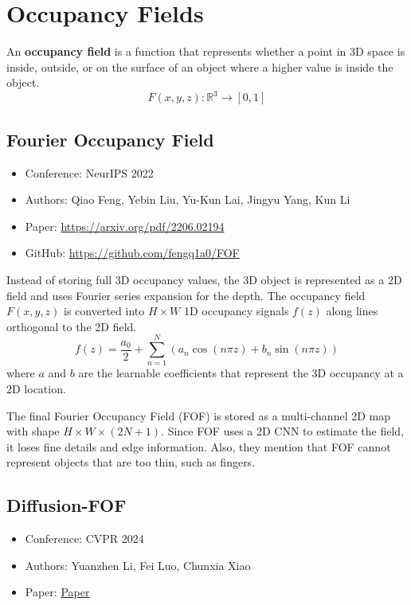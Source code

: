 \documentclass{article}
\begin{document}
\section*{Occupancy Fields}
An \textbf{occupancy field} is a function that represents whether a point in 3D space is inside, outside, or on the surface of an object where a higher value is inside the object.
\[F(x,y,z):\mathbb{R}^3\rightarrow[0,1]\]

\subsection*{Fourier Occupancy Field}

\begin{itemize}
    \item Conference: NeurIPS 2022
    \item Authors: Qiao Feng, Yebin Liu, Yu-Kun Lai, Jingyu Yang, Kun Li
    \item Paper: \url{https://arxiv.org/pdf/2206.02194}
    \item GitHub: \url{https://github.com/fengq1a0/FOF}
\end{itemize}

Instead of storing full 3D occupancy values, the 3D object is represented as a 2D field and uses Fourier series expansion for the depth. The occupancy field $F(x,y,z)$ is converted into $H\times W$ 1D occupancy signals $f(z)$ along lines orthogonal to the 2D field.
\[f(z)=\frac{a_0}{2}+\sum_{n=1}^N (a_n\cos(n\pi z)+b_n\sin(n\pi z))\]
where $a$ and $b$ are the learnable coefficients that represent the 3D occupancy at a 2D location.
\vspace{1em}

The final Fourier Occupancy Field (FOF) is stored as a multi-channel 2D map with shape $H\times W\times (2N+1)$. Since FOF uses a 2D CNN to estimate the field, it loses fine details and edge information. Also, they mention that FOF cannot represent objects that are too thin, such as fingers.

\subsection*{Diffusion-FOF}

\begin{itemize}
    \item Conference: CVPR 2024
    \item Authors: Yuanzhen Li, Fei Luo, Chunxia Xiao
    \item Paper: \href{\detokenize{https://openaccess.thecvf.com/content/CVPR2024/papers/Li_Diffusion-FOF_Single-View_Clothed_Human_Reconstruction_via_Diffusion-Based_Fourier_Occupancy_Field_CVPR_2024_paper.pdf}}{Paper}
\end{itemize}
\end{document}
